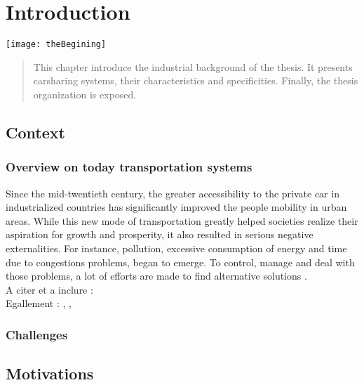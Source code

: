 \chapter{Introduction} \label{chap:introduction}
\begin{bibunit}[ieeetr]
\minitoc
\vspace{2cm}
%
\noindent
\begin{minipage}[c]{0.45\textwidth}
\texttt{[image: theBegining]}
\end{minipage}
\hfill
\begin{minipage}[c]{0.45\textwidth}
\begin{abstract}
This chapter introduce the industrial background of the thesis.
It presents carsharing systems, their characteristics and specificities.
Finally, the thesis organization is exposed.
\end{abstract}
\end{minipage}

\newpage
\section{Context}
\subsection{Overview on today transportation systems}
Since the mid-twentieth century, the greater accessibility to the private car in industrialized countries has significantly improved the people mobility in urban areas. 
While this new mode of transportation greatly helped societies realize their aspiration for growth and prosperity, it also resulted in serious negative externalities.
For instance, pollution, excessive consumption of energy and time due to congestions problems, began to emerge.
To control, manage and deal with those problems, a lot of efforts are made to find alternative solutions \cite{mitchell_reinventing_2010}.\\

A citer et a inclure : \cite{le_vine_carsharing_2014}\\
Egallement : \cite{v-traffic_letat_2014}, \cite{la_mobilite_2008}, 

\subsection{Challenges}

\section{Motivations}


\end{bibunit}
